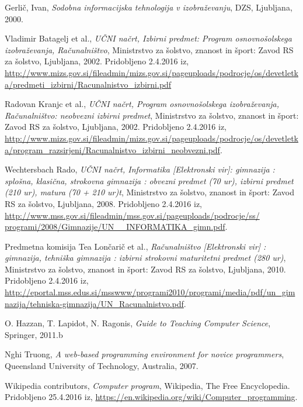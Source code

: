\begin{thebibliography}{100}

 Gerlič, Ivan, \emph{Sodobna informacijska tehnologija v
    izobraževanju}, DZS, Ljubljana, 2000.

 Vladimir Batagelj et al., \emph{UČNI
    načrt, Izbirni predmet: Program osnovnošolskega izobraževanja,
    Računalništvo}, Ministrstvo za šolstvo, znanost in šport: Zavod RS
  za šolstvo, Ljubljana, 2002. Pridobljeno 2.4.2016 iz,
  \url{http://www.mizs.gov.si/fileadmin/mizs.gov.si/pageuploads/podrocje/os/devetletka/predmeti_izbirni/Racunalnistvo_izbirni.pdf}

 Radovan Kranjc et al., \emph{UČNI
    načrt, Program osnovnošolskega izobraževanja, Računalništvo:
    neobvezni izbirni predmet}, Ministrstvo za šolstvo, znanost in
  šport: Zavod RS za šolstvo, Ljubljana, 2002. Pridobljeno 2.4.2016
  iz,
  \url{http://www.mizs.gov.si/fileadmin/mizs.gov.si/pageuploads/podrocje/os/devetletka/program_razsirjeni/Racunalnistvo_izbirni_neobvezni.pdf}.

 Wechtersbach Rado, \emph{UČNI
    načrt, Informatika [Elektronski vir]: gimnazija : splošna,
    klasična, strokovna gimnazija : obvezni predmet (70 ur), izbirni
    predmet (210 ur), matura (70 + 210 ur)t}, Ministrstvo za šolstvo,
  znanost in šport: Zavod RS za šolstvo, Ljubljana, 2008. Pridobljeno
  2.4.2016 iz,
  \url{http://www.mss.gov.si/fileadmin/mss.gov.si/pageuploads/podrocje/ss/ programi/2008/Gimnazije/UN__INFORMATIKA_gimn.pdf}.

 Predmetna komisija Tea Lončarič et al.,
  \emph{Računalništvo [Elektronski vir] : gimnazija, tehniška
    gimnazija : izbirni strokovni maturitetni predmet (280 ur)},
  Ministrstvo za šolstvo, znanost in šport: Zavod RS za šolstvo,
  Ljubljana, 2010. Pridobljeno 2.4.2016 iz,
  \url{http://eportal.mss.edus.si/msswww/programi2010/programi/media/pdf/un_gimnazija/tehniska-gimnazija/UN_Racunalnistvo.pdf}.

 O. Hazzan, T. Lapidot, N. Ragonis,
  \emph{Guide to Teaching Computer Science}, Springer, 2011.b

 Nghi Truong,
  \emph{A web-based programming environment for novice programmers},
  Queensland University of Technology, Australia, 2007.

 Wikipedia contributors, \emph{Computer
    program}, Wikipedia, The Free Encyclopedia. Pridobljeno 25.4.2016
  iz,
  \url{https://en.wikipedia.org/wiki/Computer_programming}.


\end{thebibliography}
